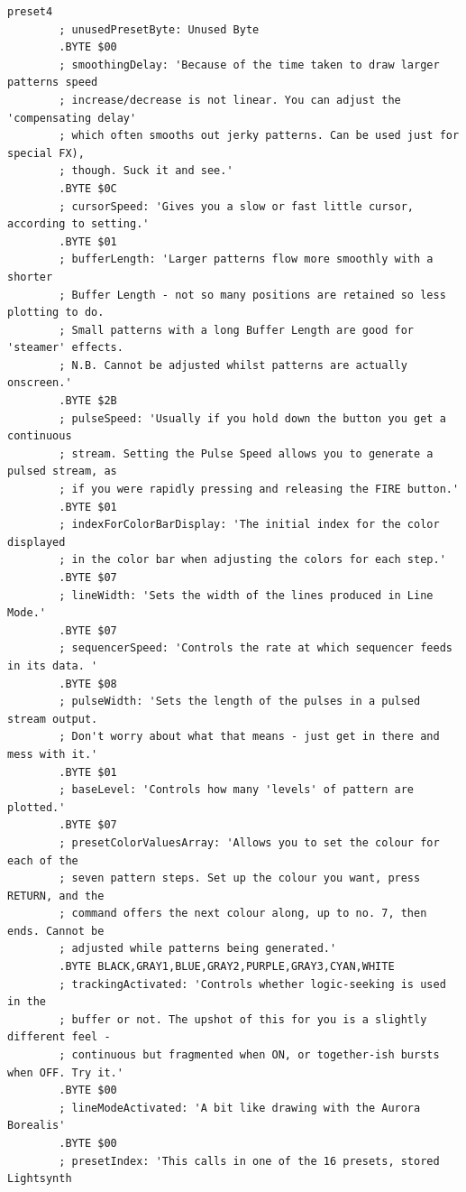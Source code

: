 \begin{lstlisting}[basicstyle=\tiny,caption=Source code for Preset 4.]
preset4
        ; unusedPresetByte: Unused Byte
        .BYTE $00
        ; smoothingDelay: 'Because of the time taken to draw larger patterns speed
        ; increase/decrease is not linear. You can adjust the 'compensating delay'
        ; which often smooths out jerky patterns. Can be used just for special FX),
        ; though. Suck it and see.'
        .BYTE $0C
        ; cursorSpeed: 'Gives you a slow or fast little cursor, according to setting.'
        .BYTE $01
        ; bufferLength: 'Larger patterns flow more smoothly with a shorter
        ; Buffer Length - not so many positions are retained so less plotting to do.
        ; Small patterns with a long Buffer Length are good for 'steamer' effects.
        ; N.B. Cannot be adjusted whilst patterns are actually onscreen.'
        .BYTE $2B
        ; pulseSpeed: 'Usually if you hold down the button you get a continuous
        ; stream. Setting the Pulse Speed allows you to generate a pulsed stream, as
        ; if you were rapidly pressing and releasing the FIRE button.'
        .BYTE $01
        ; indexForColorBarDisplay: 'The initial index for the color displayed
        ; in the color bar when adjusting the colors for each step.'
        .BYTE $07
        ; lineWidth: 'Sets the width of the lines produced in Line Mode.'
        .BYTE $07
        ; sequencerSpeed: 'Controls the rate at which sequencer feeds in its data. '
        .BYTE $08
        ; pulseWidth: 'Sets the length of the pulses in a pulsed stream output.
        ; Don't worry about what that means - just get in there and mess with it.'
        .BYTE $01
        ; baseLevel: 'Controls how many 'levels' of pattern are plotted.'
        .BYTE $07
        ; presetColorValuesArray: 'Allows you to set the colour for each of the
        ; seven pattern steps. Set up the colour you want, press RETURN, and the
        ; command offers the next colour along, up to no. 7, then ends. Cannot be
        ; adjusted while patterns being generated.'
        .BYTE BLACK,GRAY1,BLUE,GRAY2,PURPLE,GRAY3,CYAN,WHITE
        ; trackingActivated: 'Controls whether logic-seeking is used in the
        ; buffer or not. The upshot of this for you is a slightly different feel -
        ; continuous but fragmented when ON, or together-ish bursts when OFF. Try it.'
        .BYTE $00
        ; lineModeActivated: 'A bit like drawing with the Aurora Borealis'
        .BYTE $00
        ; presetIndex: 'This calls in one of the 16 presets, stored Lightsynth

\end{lstlisting}
